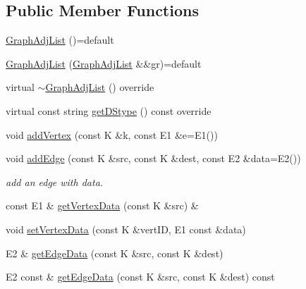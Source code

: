 \subsection*{Public Member Functions}
\begin{DoxyCompactItemize}
\item 
\mbox{\hyperlink{classbridges_1_1datastructure_1_1_graph_adj_list_adb181bcfe104b8df8b3218ccf1b67ea5}{Graph\+Adj\+List}} ()=default
\item 
\mbox{\hyperlink{classbridges_1_1datastructure_1_1_graph_adj_list_ac175167a4447f3fc9c7f3e72f2f6a0b1}{Graph\+Adj\+List}} (\mbox{\hyperlink{classbridges_1_1datastructure_1_1_graph_adj_list}{Graph\+Adj\+List}} \&\&gr)=default
\item 
virtual \mbox{\hyperlink{classbridges_1_1datastructure_1_1_graph_adj_list_a17413dc27d7e60e1aa31cafa32082d12}{$\sim$\+Graph\+Adj\+List}} () override
\item 
virtual const string \mbox{\hyperlink{classbridges_1_1datastructure_1_1_graph_adj_list_adf1bfde5ec7192f3ee334695059f8fa6}{get\+D\+Stype}} () const override
\item 
void \mbox{\hyperlink{classbridges_1_1datastructure_1_1_graph_adj_list_a3bde76e49be4330da895103475f8430b}{add\+Vertex}} (const K \&k, const E1 \&e=E1())
\item 
void \mbox{\hyperlink{classbridges_1_1datastructure_1_1_graph_adj_list_a6573cc104657315196404bcef481d890}{add\+Edge}} (const K \&src, const K \&dest, const E2 \&data=E2())
\begin{DoxyCompactList}\small\item\em add an edge with data. \end{DoxyCompactList}\item 
const E1 \& \mbox{\hyperlink{classbridges_1_1datastructure_1_1_graph_adj_list_a3a9d3875e7f6eb0d4c3500c53957b9c1}{get\+Vertex\+Data}} (const K \&src) \&
\item 
void \mbox{\hyperlink{classbridges_1_1datastructure_1_1_graph_adj_list_ab87a30e6cbaf1d2db95dce705ebdd20f}{set\+Vertex\+Data}} (const K \&vert\+ID, E1 const \&data)
\item 
E2 \& \mbox{\hyperlink{classbridges_1_1datastructure_1_1_graph_adj_list_ab56ec428deb9a5bc4499f42bbd710b1a}{get\+Edge\+Data}} (const K \&src, const K \&dest)
\item 
E2 const  \& \mbox{\hyperlink{classbridges_1_1datastructure_1_1_graph_adj_list_a5c2cdffda7c983c3141ae36acc2b698d}{get\+Edge\+Data}} (const K \&src, const K \&dest) const
\item 

\end{DoxyCompactItemize}
